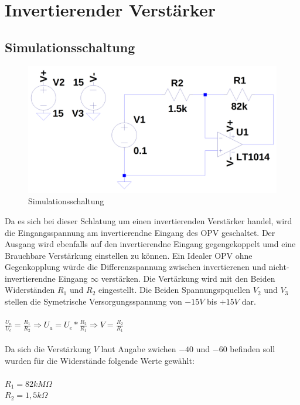 
\section{Invertierender Verst\"arker}
\subsection{Simulationsschaltung}
\begin{figure}[H]
  \begin{center}
    \includegraphics[width=1\textwidth]{./Schaltungen/InvertierenderVerstaerker.png}
    \caption{Simulationsschaltung}
  \end{center}
\end{figure}
\noindent
Da es sich bei dieser Schlatung um einen invertierenden Verst\"arker handel, wird die Eingangsspannung am invertierendne Eingang des OPV geschaltet.
Der Ausgang wird ebenfalls auf den invertierendne Eingang gegengekoppelt umd eine Brauchbare Verst\"arkung einstellen zu k\"onnen. Ein Idealer OPV ohne Gegenkopplung w\"urde die Differenzspannung zwischen invertierenen und nicht-invertierendne Eingang $\infty$ verst\"arken. Die Vert\"arkung wird mit den Beiden Widerst\"anden $R_1$ und $R_2$ eingestellt. Die Beiden Spannungspquellen $V_2$ und $V_3$ stellen die Symetrische Versorgungsspannung von $-15V$ bis $+15V$ dar.\\ \\
$\frac{U_a}{U_e}=\frac{R_1}{R_2} \Rightarrow U_a=U_e*\frac{R_2}{R_1} \Rightarrow V=\frac{R_2}{R_1}$ \\ \\
Da sich die Verst\"arkung $V$ laut Angabe zwichen $-40$ und $-60$ befinden soll wurden f\"ur die Widerst\"ande folgende Werte gew\"ahlt: \\ \\
$R_1=82kM\Omega$ \\
$R_2=1,5k\Omega$ \\
